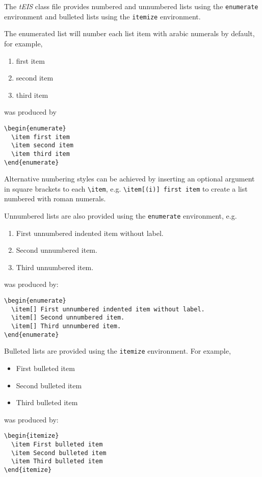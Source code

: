 \documentclass[]{tEIS2e}
\theoremstyle{plain}
\theoremstyle{remark}
\begin{document}
The {\it tEIS} class file provides numbered and unnumbered lists using the {\tt enumerate} environment and bulleted
lists  using the {\tt itemize} environment.

The enumerated list will number each list item with arabic numerals by default, for example,
%
\begin{enumerate}
  \item first item
  \item second item
  \item third item
\end{enumerate}
%
was produced by
%
\begin{verbatim}
\begin{enumerate}
  \item first item
  \item second item
  \item third item
\end{enumerate}
\end{verbatim}
%
Alternative numbering styles can be achieved by inserting an optional argument in square brackets to each \verb"\item", e.g. \verb"\item[(i)] first item" to create a list numbered with roman numerals.

Unnumbered lists are also provided using the {\tt enumerate} environment, e.g.
%
\begin{enumerate}
  \item[] First unnumbered indented item without label.
  \item[] Second unnumbered item.
  \item[] Third unnumbered item.
\end{enumerate}
%
was produced by:
%
\begin{verbatim}
\begin{enumerate}
  \item[] First unnumbered indented item without label.
  \item[] Second unnumbered item.
  \item[] Third unnumbered item.
\end{enumerate}
\end{verbatim}

Bulleted lists are provided using the {\tt itemize} environment. For example,
%
\begin{itemize}
  \item First bulleted item
  \item Second bulleted item
  \item Third bulleted item
\end{itemize}
%
was produced by:
%
\begin{verbatim}
\begin{itemize}
  \item First bulleted item
  \item Second bulleted item
  \item Third bulleted item
\end{itemize}
\end{verbatim}
%
\end{document}
